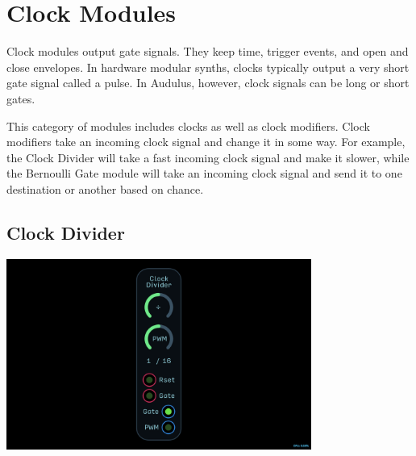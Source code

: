 \documentclass[11pt]{book}
\begin{document}
\chapter{Clock Modules}

Clock modules output gate signals. They keep time, trigger events, and open and close envelopes. In hardware modular synths, clocks typically output a very short gate signal called a pulse. In Audulus, however, clock signals can be long or short gates.

This category of modules includes clocks as well as clock modifiers. Clock modifiers take an incoming clock signal and change it in some way. For example, the Clock Divider will take a fast incoming clock signal and make it slower, while the Bernoulli Gate module will take an incoming clock signal and send it to one destination or another based on chance.

\pagebreak


\section{Clock Divider}

\begin{center}
\includegraphics[width=0.75\textwidth]{clock-divider.png}
\end{center}
\end{document}
